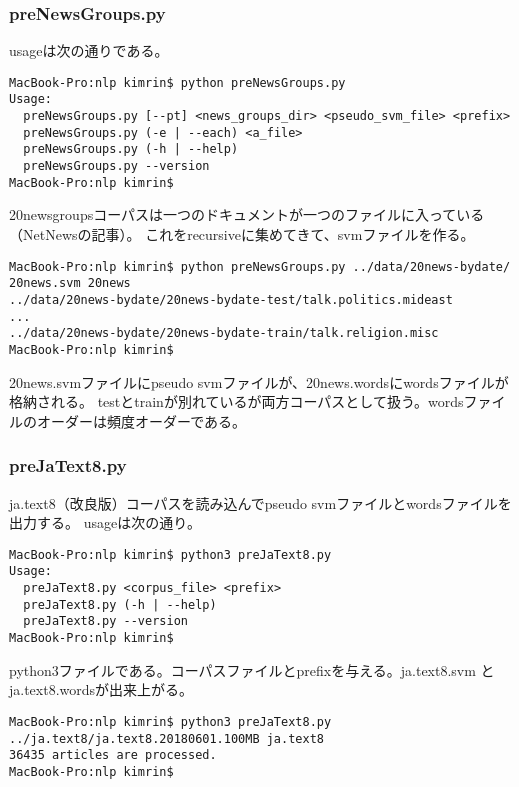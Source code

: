 \documentclass[uplatex]{jsarticle}
\begin{document}
\subsubsection{preNewsGroups.py}
usageは次の通りである。
\begin{lstlisting}
MacBook-Pro:nlp kimrin$ python preNewsGroups.py
Usage:
  preNewsGroups.py [--pt] <news_groups_dir> <pseudo_svm_file> <prefix>
  preNewsGroups.py (-e | --each) <a_file>
  preNewsGroups.py (-h | --help)
  preNewsGroups.py --version
MacBook-Pro:nlp kimrin$
\end{lstlisting}
20newsgroupsコーパスは一つのドキュメントが一つのファイルに入っている（NetNewsの記事）。
これをrecursiveに集めてきて、svmファイルを作る。
\begin{lstlisting}
MacBook-Pro:nlp kimrin$ python preNewsGroups.py ../data/20news-bydate/ 20news.svm 20news
../data/20news-bydate/20news-bydate-test/talk.politics.mideast
...
../data/20news-bydate/20news-bydate-train/talk.religion.misc
MacBook-Pro:nlp kimrin$
\end{lstlisting}

20news.svmファイルにpseudo svmファイルが、20news.wordsにwordsファイルが格納される。
testとtrainが別れているが両方コーパスとして扱う。wordsファイルのオーダーは頻度オーダーである。

\subsubsection{preJaText8.py}
ja.text8（改良版）コーパスを読み込んでpseudo svmファイルとwordsファイルを出力する。
usageは次の通り。
\begin{lstlisting}
MacBook-Pro:nlp kimrin$ python3 preJaText8.py
Usage:
  preJaText8.py <corpus_file> <prefix>
  preJaText8.py (-h | --help)
  preJaText8.py --version
MacBook-Pro:nlp kimrin$
\end{lstlisting}
python3ファイルである。コーパスファイルとprefixを与える。ja.text8.svm と ja.text8.wordsが出来上がる。

\begin{lstlisting}
MacBook-Pro:nlp kimrin$ python3 preJaText8.py ../ja.text8/ja.text8.20180601.100MB ja.text8
36435 articles are processed.
MacBook-Pro:nlp kimrin$
\end{lstlisting}
\end{document}
